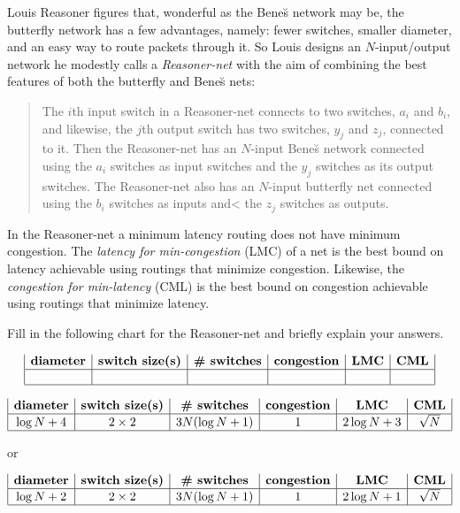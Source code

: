 \begin{problem}
Louis Reasoner figures that, wonderful as the Bene\u{s} network may be, the
butterfly network has a few advantages, namely: fewer switches, smaller
diameter, and an easy way to route packets through it.  So Louis designs an
$N$-input/output network he modestly calls a \textit{Reasoner-net} with the
aim of combining the best features of both the butterfly and Bene\u{s} nets:
\begin{quote}
The $i$th input switch in a Reasoner-net connects to two switches, $a_i$
and $b_i$, and likewise, the $j$th output switch has two switches, $y_j$
and $z_j$, connected to it.  Then the Reasoner-net has an $N$-input
Bene\u{s} network connected using the $a_i$ switches as input switches and
the $y_j$ switches as its output switches.  The Reasoner-net also has an
$N$-input butterfly net connected using the $b_i$ switches as inputs and<
the $z_j$ switches as outputs.
\end{quote}

In the Reasoner-net a minimum latency routing does not have minimum
congestion.  The \textit{latency for min-congestion} (LMC) of a net is the
best bound on latency achievable using routings that minimize congestion.
Likewise, the \textit{congestion for min-latency} (CML) is the best bound
on congestion achievable using routings that minimize latency.

Fill in the following chart for the Reasoner-net and briefly explain your
answers.

\[
\begin{array}{|c|c|c|c|c|c|}
\textbf{diameter} &
\textbf{switch size(s)} &
\textbf{\# switches} &
\textbf{congestion} &
\textbf{LMC} &
\textbf{CML}\\
\hline
&&&&&\\
\hline
\end{array}
\]

\begin{solution}

\[
\begin{array}{|c|c|c|c|c|c|}
\textbf{diameter} &
\textbf{switch size(s)} &
\textbf{\# switches} &
\textbf{congestion} &
\textbf{LMC}&
\textbf{CML}\\
\hline \log N + 4 & 2 \times 2 & 3N (\log N + 1) & 1 & 2 \log N +
3 &
\sqrt{N}\\
\hline
\end{array}
\]

or

\[
\begin{array}{|c|c|c|c|c|c|}
\textbf{diameter} & \textbf{switch size(s)} & \textbf{\# switches}
& \textbf{congestion} & \textbf{LMC}&
\textbf{CML}\\
\hline \log N + 2 & 2 \times 2 & 3N (\log N + 1) & 1 & 2 \log N +1
&
\sqrt{N}\\
\hline
\end{array}
\]


\end{solution}
\end{problem}
